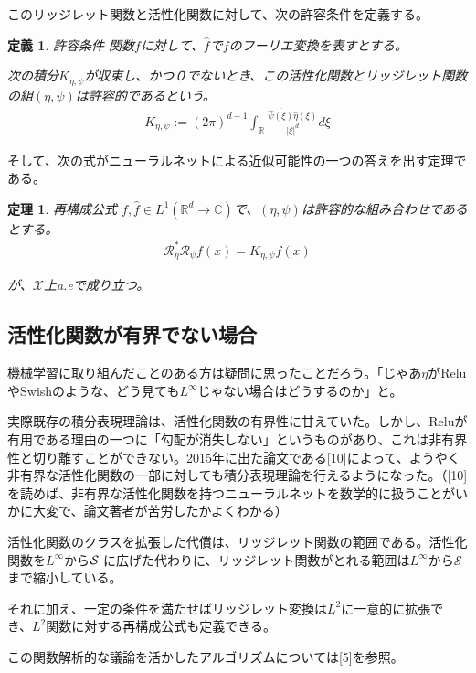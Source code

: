 \documentclass[dvipdfmx, a4paper]{jsarticle}
\newtheorem{theo}{定理}[section]
\newtheorem{defi}{定義}[section]
\begin{document}
このリッジレット関数と活性化関数に対して、次の許容条件を定義する。

\begin{defi}許容条件
関数$f$に対して、$\hat{f}$で$f$のフーリエ変換を表すとする。

次の積分$K_{\eta,\psi}$が収束し、かつ０でないとき、この活性化関数とリッジレット関数の組$(\eta,\psi)$は許容的であるという。
\begin{align}
K_{\eta,\psi}:=(2\pi)^{d-1}\int_\mathbb{R}\frac{\overline{\hat{\psi}(\xi)}\hat{\eta}(\xi)}{|\xi|^d}d\xi
\end{align}
\end{defi}

そして、次の式がニューラルネットによる近似可能性の一つの答えを出す定理である。

\begin{theo}再構成公式
$f,\hat{f}\in L^1(\mathbb{R}^d\rightarrow\mathbb{C})$で、$(\eta,\psi)$は許容的な組み合わせであるとする。
\begin{align}
\mathcal{R}^*_\eta\mathcal{R}_\psi f(x)=K_{\eta,\psi}f(x)
\end{align}

が、$\mathcal{X}$上a.eで成り立つ。
\end{theo}

\subsection{活性化関数が有界でない場合}
機械学習に取り組んだことのある方は疑問に思ったことだろう。「じゃあ$\eta$がReluやSwishのような、どう見ても$L^\infty$じゃない場合はどうするのか」と。

実際既存の積分表現理論は、活性化関数の有界性に甘えていた。しかし、Reluが有用である理由の一つに「勾配が消失しない」というものがあり、これは非有界性と切り離すことができない。2015年に出た論文である[10]によって、ようやく非有界な活性化関数の一部に対しても積分表現理論を行えるようになった。（[10]を読めば、非有界な活性化関数を持つニューラルネットを数学的に扱うことがいかに大変で、論文著者が苦労したかよくわかる）

活性化関数のクラスを拡張した代償は、リッジレット関数の範囲である。活性化関数を$L^\infty$から$\mathcal{S}^`$に広げた代わりに、リッジレット関数がとれる範囲は$L^\infty$から$\mathcal{S}$まで縮小している。

それに加え、一定の条件を満たせばリッジレット変換は$L^2$に一意的に拡張でき、$L^2$関数に対する再構成公式も定義できる。

この関数解析的な議論を活かしたアルゴリズムについては[5]を参照。
\end{document}
